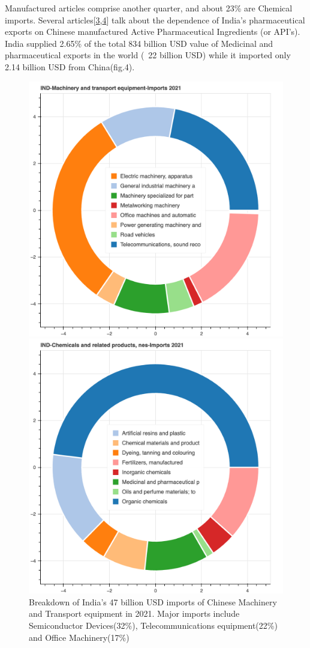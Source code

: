 \documentclass{article}
\begin{document}
Manufactured articles comprise another quarter, and about 23\% are Chemical imports. Several articles[\hyperlink{link3}{3},\hyperlink{link4}{4}] talk about the dependence of India’s pharmaceutical exports on Chinese manufactured Active Pharmaceutical Ingredients (or API's).  
India supplied 2.65\% of the total 834 billion USD value of Medicinal and pharmaceutical exports in the world (~22 billion USD) while it imported only 2.14 billion USD from China(fig.4). 

\begin{figure}[htp]
\centering
\begin{minipage}{.5\textwidth}
  \centering
  \includegraphics[width=.7\linewidth]{ind_chn_imports_machines.png}
  \captionsetup{skip=0pt,font=small} %
    \caption{Breakdown of India's 47 billion USD imports of Chinese Machinery and Transport equipment in 2021. Major imports include Semiconductor Devices(32\%), Telecommunications equipment(22\%) and Office Machinery(17\%)}
  \label{fig:test1}
\end{minipage}%
\begin{minipage}{.5\textwidth}
  \centering
  \includegraphics[width=.7\linewidth]{ind_chn_imports_chemicals.png}

\end{minipage}
\end{figure}
\end{document}

